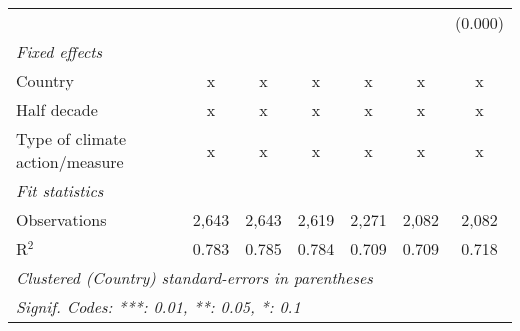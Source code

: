 \begin{tabular}{lcccccc}
                                                          &               &               &               &              &              & (0.000)\\   
   \emph{Fixed effects}\\
   Country                                                & x             & x             & x             & x            & x            & x\\  
   Half decade                                            & x             & x             & x             & x            & x            & x\\  
   Type of climate action/measure                         & x             & x             & x             & x            & x            & x\\  
   \midrule \emph{Fit statistics}\\
   Observations                                           & 2,643         & 2,643         & 2,619         & 2,271        & 2,082        & 2,082\\  
   R$^2$                                                  & 0.783         & 0.785         & 0.784         & 0.709        & 0.709        & 0.718\\  
   \midrule
   \multicolumn{7}{l}{\emph{Clustered (Country) standard-errors in parentheses}}\\
   \multicolumn{7}{l}{\emph{Signif. Codes: ***: 0.01, **: 0.05, *: 0.1}}\\
\end{tabular}
\par\endgroup


